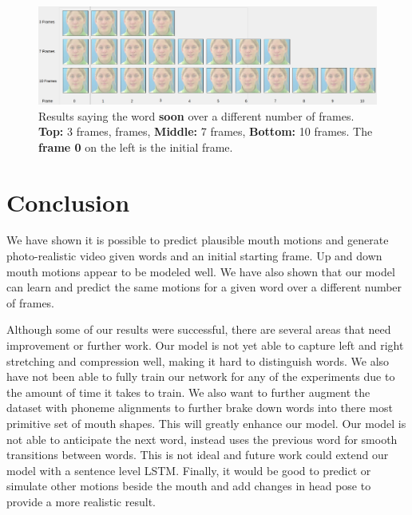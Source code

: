 \documentclass[10pt,twocolumn,letterpaper]{article}
\begin{document}
 \begin{figure}[t]
 	\begin{center}
 		\includegraphics [scale=0.2] {images/soon_time.png}
 	\end{center}
 	\caption{Results saying the word \textbf{soon} over a different number of frames. \textbf{Top:} 3 frames, frames, \textbf{Middle:} 7 frames, \textbf{Bottom:} 10 frames. The \textbf{frame 0} on the left is the initial frame.}
 	\label{fig:time}
 \end{figure}
 
\section{Conclusion}
We have shown it is possible to predict plausible mouth motions and generate photo-realistic video given words and an initial starting frame. Up and down mouth motions appear to be modeled well. We have also shown that our model can learn and predict the same motions for a given word over a different number of frames.

Although some of our results were successful, there are several areas that need improvement or further work. Our model is not yet able to capture left and right stretching and compression well, making it hard to distinguish words. We also have not been able to fully train our network for any of the experiments due to the amount of time it takes to train. We also want to further augment the dataset with phoneme alignments to further brake down words into there most primitive set of mouth shapes. This will greatly enhance our model. Our model is not able to anticipate the next word, instead uses the previous word for smooth transitions between words. This is not ideal and future work could extend our model with a sentence level LSTM. Finally, it would be good to predict or simulate other motions beside the mouth and add changes in head pose to provide a more realistic result.

{\small


}
\end{document}
